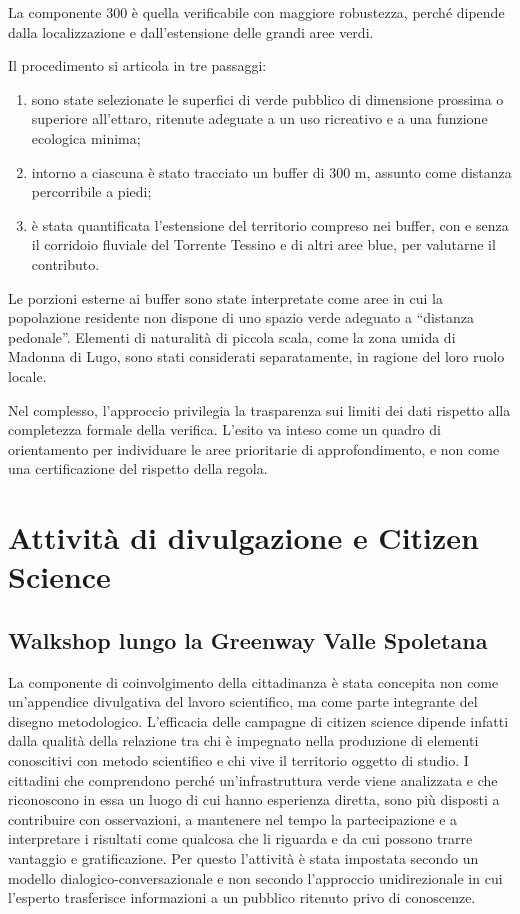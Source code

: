\documentclass[
  a4paper,
]{book}
\providecommand{\tightlist}{%
  \setlength{\itemsep}{0pt}\setlength{\parskip}{0pt}}
\begin{document}
La componente 300 è quella verificabile con maggiore robustezza, perché dipende dalla localizzazione e dall'estensione delle grandi aree verdi.

Il procedimento si articola in tre passaggi:

\begin{enumerate}
\def\labelenumi{\arabic{enumi}.}
\tightlist
\item
  sono state selezionate le superfici di verde pubblico di dimensione prossima o superiore all'ettaro, ritenute adeguate a un uso ricreativo e a una funzione ecologica minima;
\item
  intorno a ciascuna è stato tracciato un buffer di 300 m, assunto come distanza percorribile a piedi;
\item
  è stata quantificata l'estensione del territorio compreso nei buffer, con e senza il corridoio fluviale del Torrente Tessino e di altri aree blue, per valutarne il contributo.
\end{enumerate}

Le porzioni esterne ai buffer sono state interpretate come aree in cui la popolazione residente non dispone di uno spazio verde adeguato a ``distanza pedonale''.
Elementi di naturalità di piccola scala, come la zona umida di Madonna di Lugo, sono stati considerati separatamente, in ragione del loro ruolo locale.

Nel complesso, l'approccio privilegia la trasparenza sui limiti dei dati rispetto alla completezza formale della verifica.
L'esito va inteso come un quadro di orientamento per individuare le aree prioritarie di approfondimento, e non come una certificazione del rispetto della regola.

\section{Attività di divulgazione e Citizen Science}\label{attivituxe0-di-divulgazione-e-citizen-science}

\subsection{Walkshop lungo la Greenway Valle Spoletana}\label{walkshop-lungo-la-greenway-valle-spoletana}

La componente di coinvolgimento della cittadinanza è stata concepita non come un'appendice divulgativa del lavoro scientifico, ma come parte integrante del disegno metodologico.
L'efficacia delle campagne di citizen science dipende infatti dalla qualità della relazione tra chi è impegnato nella produzione di elementi conoscitivi con metodo scientifico e chi vive il territorio oggetto di studio.
I cittadini che comprendono perché un'infrastruttura verde viene analizzata e che riconoscono in essa un luogo di cui hanno esperienza diretta, sono più disposti a contribuire con osservazioni, a mantenere nel tempo la partecipazione e a interpretare i risultati come qualcosa che li riguarda e da cui possono trarre vantaggio e gratificazione.
Per questo l'attività è stata impostata secondo un modello dialogico-conversazionale e non secondo l'approccio unidirezionale in cui l'esperto trasferisce informazioni a un pubblico ritenuto privo di conoscenze.
\end{document}
